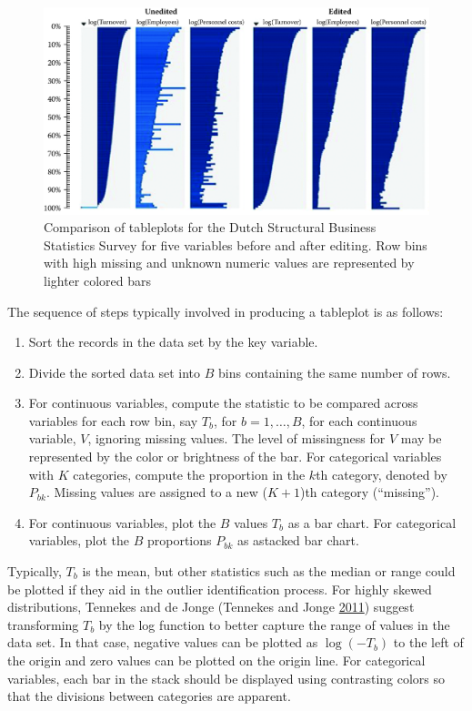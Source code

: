 \documentclass[]{krantz}
\begin{document}
\begin{figure}

{\centering \includegraphics[width=0.7\linewidth]{ChapterError/figures/fig10-7} 

}

\caption{Comparison of tableplots for the Dutch Structural Business Statistics Survey for five variables before and after editing. Row bins with high missing and unknown numeric values are represented by lighter colored bars}\label{fig:fig10-7}
\end{figure}

The sequence of steps typically involved in producing a tableplot is as
follows:

\begin{enumerate}
\def\labelenumi{\arabic{enumi}.}
\item
  Sort the records in the data set by the key variable.
\item
  Divide the sorted data set into \(B\) bins containing the same number
  of rows.
\item
  For continuous variables, compute the statistic to be compared across
  variables for each row bin, say \(T_{b}\), for \(b = 1,\ldots ,B\),
  for each continuous variable, \(V\), ignoring missing values. The
  level of missingness for \(V\) may be represented by the color or
  brightness of the bar. For categorical variables with \(K\)
  categories, compute the proportion in the \(k\)th category, denoted by
  \(P_{bk}\). Missing values are assigned to a new (\(K+1\))th category
  (``missing'').
\item
  For continuous variables, plot the \(B\) values \(T_{b}\) as a bar
  chart. For categorical variables, plot the \(B\) proportions
  \(P_{bk}\) as astacked bar chart.
\end{enumerate}

Typically, \(T_{b}\) is the mean, but other statistics such as the
median or range could be plotted if they aid in the outlier
identification process. For highly skewed distributions, Tennekes and de
Jonge (Tennekes and Jonge \protect\hyperlink{ref-tennekes2011top}{2011})
suggest transforming \(T_{b}\) by the log function to better capture the
range of values in the data set. In that case, negative values can be
plotted as \(\log(-T_{b})\) to the left of the origin and zero values
can be plotted on the origin line. For categorical variables, each bar
in the stack should be displayed using contrasting colors so that the
divisions between categories are apparent.
\end{document}
